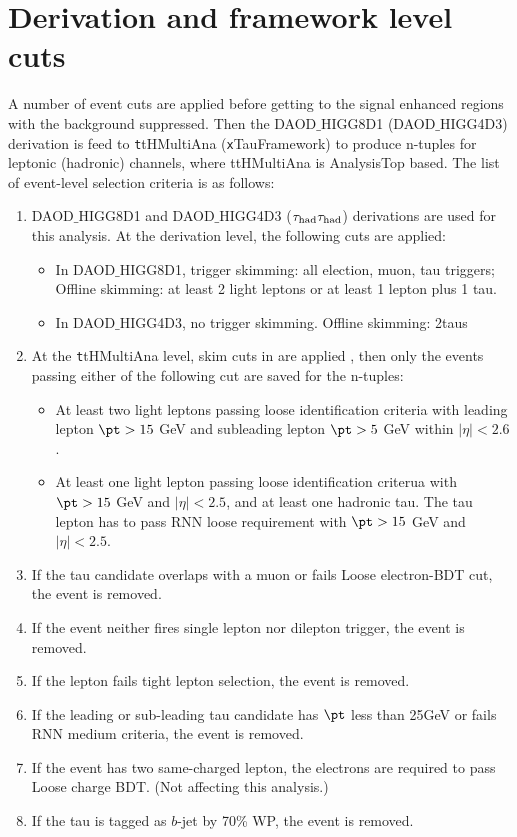 \section{Derivation and framework level cuts}
\label{app:cuts}
A number of event cuts are applied before getting to the signal enhanced regions with the background suppressed. Then the DAOD$\_$HIGG8D1 (DAOD$\_$HIGG4D3) derivation is feed to {\texttt ttHMultiAna} ({\texttt xTauFramework}) to produce n-tuples for leptonic (hadronic) channels, where ttHMultiAna is AnalysisTop \cite{AnalysisTop} based. The list of event-level selection criteria is as follows:

\begin{enumerate}
\item DAOD$\_$HIGG8D1 and DAOD$\_$HIGG4D3 ($\tau_\text{had}{}\tau_\text{had}$) derivations are used for this analysis. At the derivation level, the following cuts are applied:
  \begin{itemize}
  \item In DAOD$\_$HIGG8D1, trigger skimming: all election, muon, tau triggers; Offline skimming: at least 2 light leptons or at least 1 lepton plus 1 tau.
  \item In DAOD$\_$HIGG4D3, no trigger skimming. Offline skimming: 2taus
  \end{itemize}
\item At the {\texttt ttHMultiAna} level, skim cuts in \cite{ATL-COM-PHYS-2018-410} are applied , then only the events passing either of the following cut are saved for the n-tuples:
  \begin{itemize}
  \item At least two light leptons passing loose identification criteria with leading lepton $\pt > 15$ GeV and subleading lepton $\pt > 5$ GeV within $|\eta|<2.6$.
  \item At least one light lepton passing loose identification criterua with $\pt >15$ GeV and $|\eta|<2.5$, and at least one hadronic tau. The tau lepton has to pass RNN loose requirement with $\pt >15$ GeV and $|\eta|<2.5$.
  \end{itemize}
\item If the tau candidate overlaps with a muon or fails Loose electron-BDT cut, the event is removed.
\item If the event neither fires single lepton nor dilepton trigger, the event is removed.
\item If the lepton fails tight lepton selection, the event is removed.
\item If the leading or sub-leading tau candidate has $\pt$ less than 25GeV or fails RNN medium criteria, the event is removed.
\item If the event has two same-charged lepton, the electrons are required to pass Loose charge BDT. (Not affecting this analysis.)
\item If the tau is tagged as $b$-jet by 70\% WP, the event is removed.




\end{enumerate}
